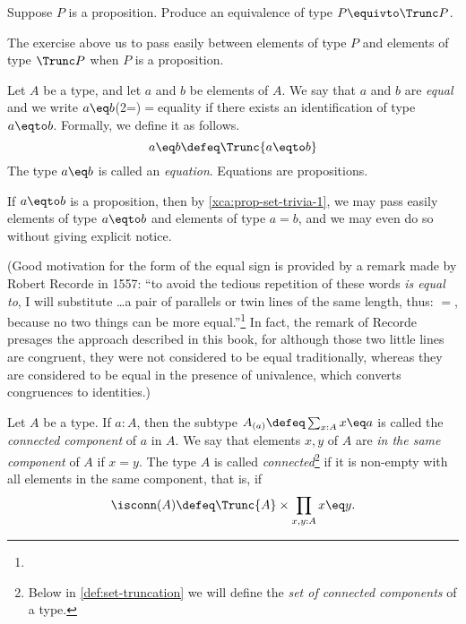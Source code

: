 \begin{xca}\label{xca:prop-set-trivia-1}
  Suppose $P$ is a proposition.  Produce an equivalence of type $P \equivto \Trunc P$.
\end{xca}

The exercise above us to pass easily between elements of type $P$ and elements of type
$\Trunc P$ when $P$ is a proposition.

\begin{definition}
  Let $A$ be a type, and let $a$ and $b$ be elements of $A$.  We say that $a$ and $b$ are \emph{equal} and
  we write $a \eq b$\glossary(2=){$=$}{equality} if there exists an identification of type $a \eqto b$.  Formally, we define it as follows.
  \[
  a \eq b \defeq \Trunc {a \eqto b}
  \]
  The type $a \eq b$ is called an \emph{equation}.  Equations are propositions.
\end{definition}

\begin{remark}
  If $a \eqto b$ is a proposition, then by \cref{xca:prop-set-trivia-1}, we may pass easily elements of type
  $a \eqto b$ and elements of type $a = b$, and we may even do so without giving explicit notice.
\end{remark}

(Good motivation for the form of the equal sign is provided by a remark made by Robert Recorde in 1557: ``to avoid the tedious repetition of
these words \emph{is equal to}, I will substitute \dots a pair of parallels or twin lines of the same length, thus: $=$, because no two things
can be more equal.''\footnote{}
In fact, the remark of Recorde presages the approach described in this book, for although those two little lines are congruent,
they were not considered to be equal traditionally, whereas they are considered to be equal in the presence of univalence,
which converts congruences to identities.)

\begin{definition}\label{def:connected}
  Let $A$ be a type. If $a:A$, then the subtype $A_{(a)}\defeq \sum_{x:A} x \eq a$
  is called the \emph{connected component} of $a$ in $A$.
  We say that elements $x,y$ of $A$ are \emph{in the same component} of $A$ if $x = y$.
  The type $A$ is called \emph{connected}\footnote{%
    Below in \cref{def:set-truncation} we will
    define the \emph{set of connected components} of a type.}
  if it is non-empty with
  all elements in the same component, that is, if
  \[
    \isconn(A) \defeq \Trunc{A} \times \prod_{x,y:A} x \eq y.
  \]\qedhere
\end{definition}


